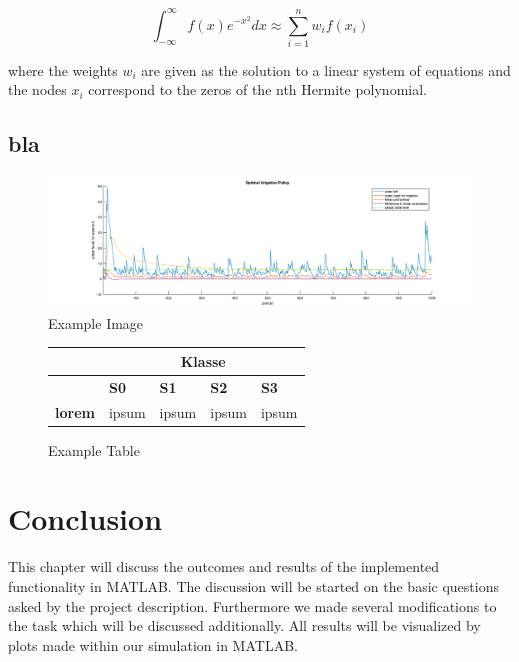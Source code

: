 \documentclass[12pt, a4paper, oneside]{article}
\begin{document}
	\begin{equation}
	\int_{-\infty}^{\infty} f(x)e^{-x^2} dx \approx \sum_{i=1}^{n}{w_if(x_i)}
	\end{equation}

where the weights $w_i$ are given as the solution to a linear system of equations and the nodes $x_i$ correspond to the zeros of the nth Hermite polynomial. \cite{seminar:week6}

	\subsection{bla}
	\begin{figure}[ht] %
		\includegraphics[width=1\textwidth]{figures/example.png}
		\caption{Example Image}
		\label{fig:example-pic}
	\end{figure}
	\blindtext
	\begin{figure}[ht] %
		\begin{longtable}{|p{2,5cm}|p{}|p{}|p{3cm}|p{3cm}|}
			\hline
			&\multicolumn{4}{c|}{\textbf{Klasse}} \\
			\hline
			& \textbf{S0} & \textbf{S1} & \textbf{S2} & \textbf{S3} \\
			\hline
			\textbf{lorem} & ipsum & ipsum & ipsum & ipsum \\
			\hline
		\end{longtable}
		\label{fig:example-figure}
		\caption{Example Table}
	\end{figure}
	\blindtext
	\blindtext
	\blindtext
	
	
	\section{Conclusion}
	This chapter will discuss the outcomes and results of the implemented functionality in MATLAB.
	The discussion will be started on the basic questions asked by the project description.
	Furthermore we made several modifications to the task which will be discussed additionally.
	All results will be visualized by plots made within our simulation in MATLAB.
\end{document}
